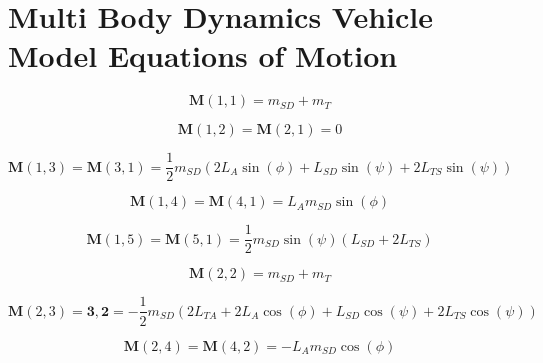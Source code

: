 \appendix
\chapter{Multi Body Dynamics Vehicle Model Equations of Motion}\label{A:MBDVMEOM}
\vspace{-20pt}
\begin{linenomath*}
    \begin{equation}
       \mathbf{M}(1,1) =  m_{SD} + m_T
    \end{equation}
\end{linenomath*}
\begin{linenomath*}
    \begin{equation}
        \mathbf{M}(1,2) = \mathbf{M}(2,1) = 0
    \end{equation}
\end{linenomath*}
\begin{linenomath*}
    \begin{equation}
        \mathbf{M}(1,3) = \mathbf{M}(3,1) = \frac{1}{2}m_{SD}(2L_{A}\sin(\phi) + L_{SD}\sin(\psi) + 2L_{TS}\sin(\psi))
    \end{equation}
\end{linenomath*}
\begin{linenomath*}
    \begin{equation}
        \mathbf{M}(1,4) = \mathbf{M}(4,1) = L_{A}m_{SD}\sin(\phi)
    \end{equation}
\end{linenomath*}
\begin{linenomath*}
    \begin{equation}
        \mathbf{M}(1,5) = \mathbf{M}(5,1) =  \frac{1}{2}m_{SD}\sin(\psi)(L_{SD} + 2L_{TS})
    \end{equation}
\end{linenomath*}
\begin{linenomath*}
    \begin{equation}
        \mathbf{M}(2,2) = m_{SD} + m_T
    \end{equation}
\end{linenomath*}
\begin{linenomath*}
    \begin{equation}
        \mathbf{M}(2,3) = \mathbf{3,2} = -\frac{1}{2}m_{SD}(2L_{TA} + 2L_{A}\cos(\phi) + L_{SD}\cos(\psi) + 2L_{TS}\cos(\psi))
    \end{equation}
\end{linenomath*}
\begin{linenomath*}
    \begin{equation}
        \mathbf{M}(2,4) = \mathbf{M}(4,2) = -L_{A}m_{SD}\cos(\phi)
    \end{equation}
\end{linenomath*}

